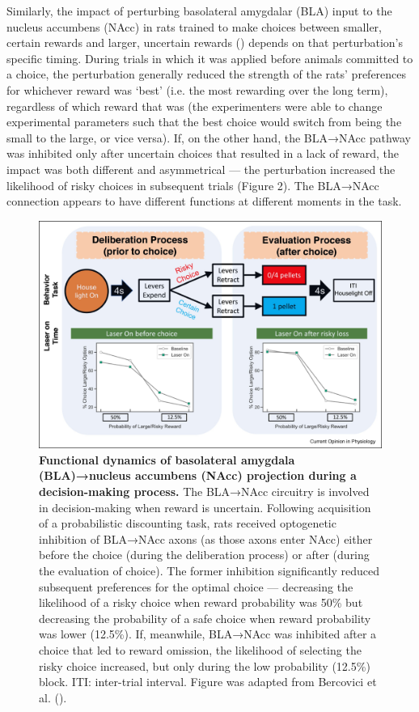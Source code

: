 \begin{refsection}
Similarly, the impact of perturbing basolateral amygdalar (BLA) input to the nucleus accumbens (NAcc) in rats trained to make choices between smaller, certain rewards and larger, uncertain rewards (\cite{bercovici2018a}) depends on that perturbation’s specific timing. During trials in which it was applied before animals committed to a choice, the perturbation generally reduced the strength of the rats’ preferences for whichever reward was ‘best’ (i.e. the most rewarding over the long term), regardless of which reward that was (the experimenters were able to change experimental parameters such that the best choice would switch from being the small to the large, or vice versa). If, on the other hand, the BLA→NAcc pathway was inhibited only after uncertain choices that resulted in a lack of reward, the impact was both different and asymmetrical — the perturbation increased the likelihood of risky choices in subsequent trials (Figure 2). The BLA→NAcc connection appears to have different functions at different moments in the task.

\begin{figure}
\includegraphics[width=\linewidth]{lin_2021_review_figs/1-s2.0-S2468867320301693-gr2_lrg.jpg}
\caption{\textbf{Functional dynamics of basolateral amygdala (BLA)→nucleus accumbens (NAcc) projection during a decision-making process.} The BLA→NAcc circuitry is involved in decision-making when reward is uncertain. Following acquisition of a probabilistic discounting task, rats received optogenetic inhibition of BLA→NAcc axons (as those axons enter NAcc) either before the choice (during the deliberation process) or after (during the evaluation of choice). The former inhibition significantly reduced subsequent preferences for the optimal choice — decreasing the likelihood of a risky choice when reward probability was 50\% but decreasing the probability of a safe choice when reward probability was lower (12.5\%). If, meanwhile, BLA→NAcc was inhibited after a choice that led to reward omission, the likelihood of selecting the risky choice increased, but only during the low probability (12.5\%) block. ITI: inter-trial interval. Figure was adapted from Bercovici et al. (\cite{bercovici2018a}).}
\label{fig:wrapfig}
\end{figure}


\end{refsection}
